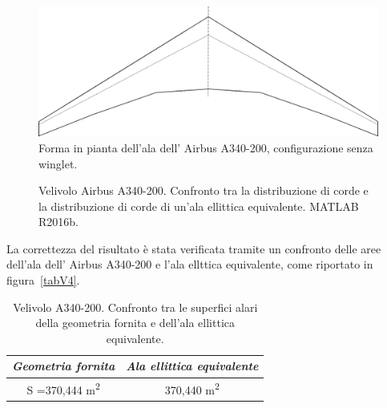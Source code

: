 \begin {figure} [H]
\centering
\includegraphics[width= \textwidth ]{images/fileImg/Parte_3-Aerodinamica_Velivolo_A340-200/AlaA340_200_nowl.png}
\caption{\footnotesize Forma in pianta dell'ala dell' Airbus A340-200, configurazione senza winglet.}
\label {fig:V3}
\end {figure}
\begin{figure}[h!]
	\centering
	\caption{\footnotesize Velivolo Airbus A340-200. Confronto tra la distribuzione di corde e la distribuzione di corde di un'ala ellittica equivalente. MATLAB R2016b. }
	\label{fig:V4}
\end{figure}

La correttezza del risultato è stata verificata tramite un confronto delle aree dell'ala dell' Airbus A340-200 e l'ala ellttica equivalente, come riportato in figura~\vref{tabV4}.

\begin{table} [!h]\centering {}
	\begin{tabular}{c c }
		\toprule
		\emph{Geometria fornita }& \emph{Ala ellittica equivalente}\\ 
		\midrule
		S =370,444 \si{m^2} &	370,440 \si{m^2}\\
		\bottomrule
	\end{tabular}
	\caption {\footnotesize Velivolo A340-200. Confronto tra le superfici alari della geometria fornita e dell'ala ellittica equivalente.}
	\label{tabV4}
\end{table}

